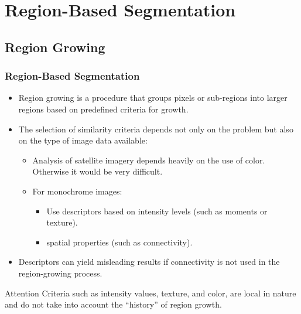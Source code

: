 \section{Region-Based Segmentation}

\subsection{Region Growing}

\begin{frame}[fragile]
\frametitle{Region-Based Segmentation}
\begin{itemize}
\item Region growing is a procedure that groups pixels or sub-regions into larger regions based on predefined criteria for growth.
\item The selection of similarity criteria depends not only on the problem but also on the type of image data available:
\begin{itemize}
\item Analysis of satellite imagery depends heavily on the use of color. Otherwise it would be very difficult.
\item For monochrome images:
\begin{itemize}
\item Use descriptors based on intensity levels (such as moments or texture).
\item spatial properties (such as connectivity).
\end{itemize}
\end{itemize}
\end{itemize}
\end{frame}

\begin{frame}
\begin{itemize}
\item Descriptors can yield misleading results if connectivity is not used in the region-growing process.
\end{itemize}
\begin{block}{Attention}
Criteria such as intensity values, texture, and color, are local in nature and do not take into account the ``history'' of region growth.
\end{block}
\end{frame}

